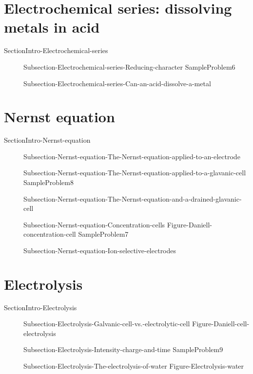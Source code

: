 \documentclass[main.tex]{subfiles}
\begin{document}
\section{Electrochemical series: dissolving metals in acid}{SectionIntro-Electrochemical-series}
\sloppy\begin{description}
   \item[] {Subsection-Electrochemical-series-Reducing-character}
  {SampleProblem6}
\item[] {Subsection-Electrochemical-series-Can-an-acid-dissolve-a-metal}
\end{description}


\section{Nernst equation}{SectionIntro-Nernst-equation}
\sloppy\begin{description}
   \item[] {Subsection-Nernst-equation-The-Nernst-equation-applied-to-an-electrode}
   \item[] {Subsection-Nernst-equation-The-Nernst-equation-applied-to-a-glavanic-cell}
     {SampleProblem8}
   \item[] {Subsection-Nernst-equation-The-Nernst-equation-and-a-drained-glavanic-cell}
   \item[] {Subsection-Nernst-equation-Concentration-cells}
{Figure-Daniell-concentration-cell}
  {SampleProblem7}
   \item[] {Subsection-Nernst-equation-Ion-selective-electrodes}
\end{description}
 
 \section{Electrolysis}{SectionIntro-Electrolysis}
\sloppy\begin{description}
    \item[] {Subsection-Electrolysis-Galvanic-cell-vs.-electrolytic-cell}
{Figure-Daniell-cell-electrolysis}
     \item[] {Subsection-Electrolysis-Intensity-charge-and-time}
     {SampleProblem9}
     \item[] {Subsection-Electrolysis-The-electrolysis-of-water}
{Figure-Electrolysis-water}

\end{description}
\end{document}
